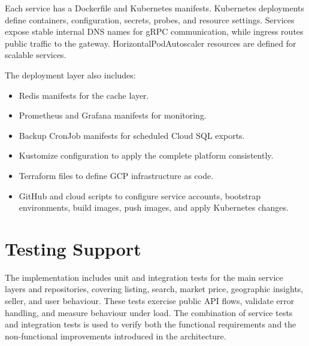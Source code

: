 Each service has a Dockerfile and Kubernetes manifests. Kubernetes deployments define containers, configuration, secrets, probes, and resource settings. Services expose stable internal DNS names for gRPC communication, while ingress routes public traffic to the gateway. HorizontalPodAutoscaler resources are defined for scalable services.

The deployment layer also includes:

\begin{itemize}
    \item Redis manifests for the cache layer.
    \item Prometheus and Grafana manifests for monitoring.
    \item Backup CronJob manifests for scheduled Cloud SQL exports.
    \item Kustomize configuration to apply the complete platform consistently.
    \item Terraform files to define GCP infrastructure as code.
    \item GitHub and cloud scripts to configure service accounts, bootstrap environments, build images, push images, and apply Kubernetes changes.
\end{itemize}

\section{Testing Support}

The implementation includes unit and integration tests for the main service layers and repositories, covering listing, search, market price, geographic insights, seller, and user behaviour. These tests exercise public API flows, validate error handling, and measure behaviour under load. The combination of service tests and integration tests is used to verify both the functional requirements and the non-functional improvements introduced in the architecture.
